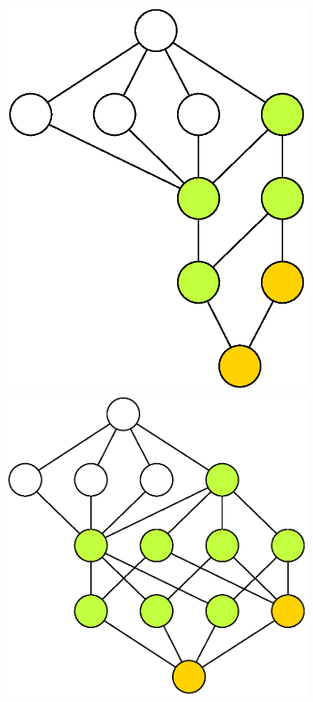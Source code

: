 \begin{figure}[H]

\centering
\includegraphics[scale=0.5]{Thesis/images/Coloured36_10LatticeGraph.eps}\hfill
\hfill\includegraphics[scale=0.5]{Thesis/images/Coloured36_42LatticeGraph.eps}\hfill

\caption{}


\end{figure}
